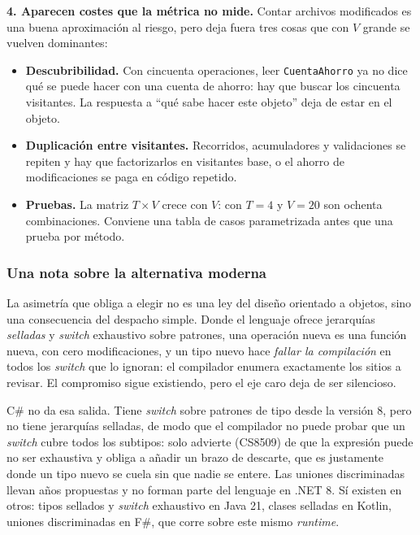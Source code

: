 \textbf{4. Aparecen costes que la métrica no mide.} Contar archivos modificados es una buena
aproximación al riesgo, pero deja fuera tres cosas que con $V$ grande se vuelven dominantes:

\begin{itemize}[leftmargin=1.2cm]
    \item \textbf{Descubribilidad.} Con cincuenta operaciones, leer \texttt{CuentaAhorro} ya
          no dice qué se puede hacer con una cuenta de ahorro: hay que buscar los cincuenta
          visitantes. La respuesta a ``qué sabe hacer este objeto'' deja de estar en el
          objeto.
    \item \textbf{Duplicación entre visitantes.} Recorridos, acumuladores y validaciones se
          repiten y hay que factorizarlos en visitantes base, o el ahorro de modificaciones se
          paga en código repetido.
    \item \textbf{Pruebas.} La matriz $T \times V$ crece con $V$: con $T = 4$ y $V = 20$ son
          ochenta combinaciones. Conviene una tabla de casos parametrizada antes que una
          prueba por método.
\end{itemize}

\subsubsection*{Una nota sobre la alternativa moderna}

La asimetría que obliga a elegir no es una ley del diseño orientado a objetos, sino una
consecuencia del despacho simple. Donde el lenguaje ofrece jerarquías \emph{selladas} y
\textit{switch} exhaustivo sobre patrones, una operación nueva es una función nueva, con cero
modificaciones, y un tipo nuevo hace \emph{fallar la compilación} en todos los \textit{switch}
que lo ignoran: el compilador enumera exactamente los sitios a revisar. El compromiso sigue
existiendo, pero el eje caro deja de ser silencioso.

C\# no da esa salida. Tiene \textit{switch} sobre patrones de tipo desde la versión 8, pero no
tiene jerarquías selladas, de modo que el compilador no puede probar que un \textit{switch}
cubre todos los subtipos: solo advierte (CS8509) de que la expresión puede no ser exhaustiva y
obliga a añadir un brazo de descarte, que es justamente donde un tipo nuevo se cuela sin que
nadie se entere. Las uniones discriminadas llevan años propuestas y no forman parte del
lenguaje en .NET 8. Sí existen en otros: tipos sellados y \textit{switch} exhaustivo en
Java 21, clases selladas en Kotlin, uniones discriminadas en F\#, que corre sobre este mismo
\textit{runtime}.

